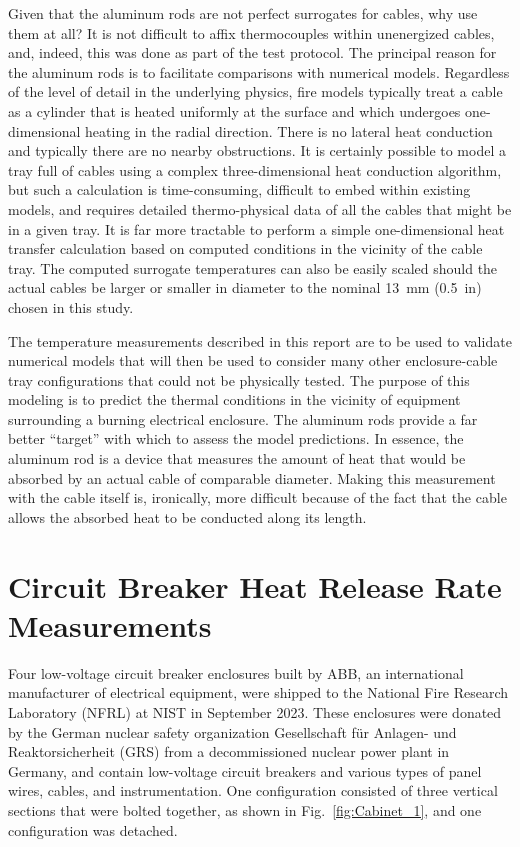 Given that the aluminum rods are not perfect surrogates for cables, why use them at all? It is not difficult to affix thermocouples within unenergized cables, and, indeed, this was done as part of the test protocol. The principal reason for the aluminum rods is to facilitate comparisons with numerical models. Regardless of the level of detail in the underlying physics, fire models typically treat a cable as a cylinder that is heated uniformly at the surface and which undergoes one-dimensional heating in the radial direction. There is no lateral heat conduction and typically there are no nearby obstructions. It is certainly possible to model a tray full of cables using a complex three-dimensional heat conduction algorithm, but such a calculation is time-consuming, difficult to embed within existing models, and requires detailed thermo-physical data of all the cables that might be in a given tray. It is far more tractable to perform a simple one-dimensional heat transfer calculation based on computed conditions in the vicinity of the cable tray. The computed surrogate temperatures can also be easily scaled should the actual cables be larger or smaller in diameter to the nominal 13~mm (0.5~in) chosen in this study.

The temperature measurements described in this report are to be used to validate numerical models that will then be used to consider many other enclosure-cable tray configurations that could not be physically tested. The purpose of this modeling is to predict the thermal conditions in the vicinity of equipment surrounding a burning electrical enclosure. The aluminum rods provide a far better ``target'' with which to assess the model predictions. In essence, the aluminum rod is a device that measures the amount of heat that would be absorbed by an actual cable of comparable diameter. Making this measurement with the cable itself is, ironically, more difficult because of the fact that the cable allows the absorbed heat to be conducted along its length.

\newpage

\section{Circuit Breaker Heat Release Rate Measurements}
\label{Sec:Circuit Breakers}

Four low-voltage circuit breaker enclosures built by ABB, an international manufacturer of electrical equipment, were shipped to the National Fire Research Laboratory (NFRL) at NIST in September 2023. These enclosures were donated by the German nuclear safety organization Gesellschaft für Anlagen- und Reaktorsicherheit (GRS) from a decommissioned nuclear power plant in Germany, and contain low-voltage circuit breakers and various types of panel wires, cables, and instrumentation. One configuration consisted of three vertical sections that were bolted together, as shown in Fig.~\ref{fig:Cabinet_1}, and one configuration was detached.

